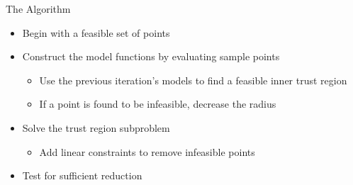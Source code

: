 \documentclass{beamer}
\begin{document}
\begin{frame}{The Algorithm}
    \begin{itemize}
        \item Begin with a feasible set of points
        \item Construct the model functions by evaluating sample points
            \begin{itemize}
                \item Use the previous iteration's models to find a feasible inner trust region
                \item If a point is found to be infeasible, decrease the radius
            \end{itemize}
        \item Solve the trust region subproblem
            \begin{itemize}
                \item Add linear constraints to remove infeasible points
            \end{itemize}
        \item Test for sufficient reduction
    \end{itemize}
\end{frame}


\end{document}
